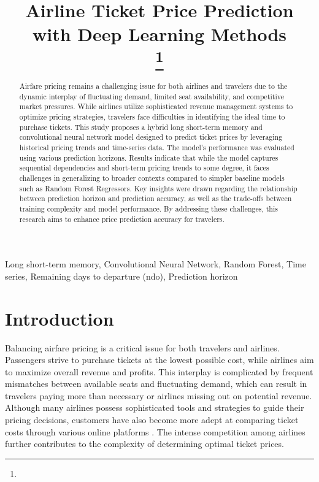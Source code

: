 \documentclass[conference]{IEEEtran}
\begin{document}
\title{Airline Ticket Price Prediction with Deep Learning Methods\\

\thanks{}
}
\author{
}

\maketitle

\begin{abstract}
Airfare pricing remains a challenging issue for both airlines and travelers due to the dynamic interplay of fluctuating demand, limited seat availability, and competitive market pressures. While airlines utilize sophisticated revenue management systems to optimize pricing strategies, travelers face difficulties in identifying the ideal time to purchase tickets. This study proposes a hybrid long short-term memory and convolutional neural network model designed to predict ticket prices by leveraging historical pricing trends and time-series data. The model’s performance was evaluated using various prediction horizons. Results indicate that while the model captures sequential dependencies and short-term pricing trends to some degree, it faces challenges in generalizing to broader contexts compared to simpler baseline models such as Random Forest Regressors. Key insights were drawn regarding the relationship between prediction horizon and prediction accuracy, as well as the trade-offs between training complexity and model performance. By addressing these challenges, this research aims to enhance price prediction accuracy for travelers.
\end{abstract}

\begin{IEEEkeywords}
Long short-term memory, Convolutional Neural Network, Random Forest, Time series, Remaining days to departure (ndo), Prediction horizon
\end{IEEEkeywords}


\section{Introduction}
Balancing airfare pricing is a critical issue for both travelers and airlines. Passengers strive to purchase tickets at the lowest possible cost, while airlines aim to maximize overall revenue and profits. This interplay is complicated by frequent mismatches between available seats and fluctuating demand, which can result in travelers paying more than necessary or airlines missing out on potential revenue. Although many airlines possess sophisticated tools and strategies to guide their pricing decisions, customers have also become more adept at comparing ticket costs through various online platforms \cite{b1}. The intense competition among airlines further contributes to the complexity of determining optimal ticket prices.
\end{document}
